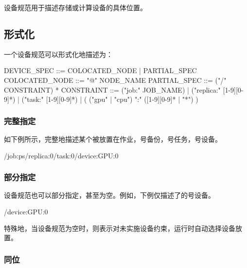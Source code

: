 \begin{content}

设备规范用于描述存储或计算设备的具体位置。

\subsection{形式化}

一个设备规范可以形式化地描述为：

\begin{leftbar}
\begin{python}
DEVICE_SPEC ::= COLOCATED_NODE | PARTIAL_SPEC
COLOCATED_NODE ::= "@" NODE_NAME
PARTIAL_SPEC ::= ("/" CONSTRAINT) *
CONSTRAINT ::= ("job:" JOB_NAME)
             | ("replica:" [1-9][0-9]*)
             | ("task:" [1-9][0-9]*)
             | ( ("gpu" | "cpu") ":" ([1-9][0-9]* | "*") )
\end{python}
\end{leftbar}

\subsubsection{完整指定}

如下例所示，完整地描述某个被放置在作业，号备份，号任务，号设备。

\begin{leftbar}
\begin{python}
/job:ps/replica:0/task:0/device:GPU:0
\end{python}
\end{leftbar}

\subsubsection{部分指定}

设备规范也可以部分指定，甚至为空。例如，下例仅描述了的号设备。

\begin{leftbar}
\begin{python}
/device:GPU:0
\end{python}
\end{leftbar}

特殊地，当设备规范为空时，则表示对未实施设备约束，运行时自动选择设备放置。

\subsubsection{同位}


\end{content}
